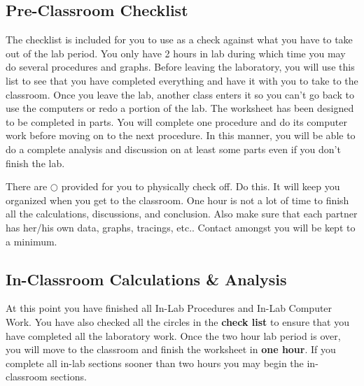 \subsection{Pre-Classroom Checklist}
The checklist is included for you to use as a check against what you have
to take out of the lab period.  You only have 2 hours in lab during which
time you may do several procedures and graphs.  Before leaving the laboratory, 
you will use this list to see that you have completed everything and have it
with you to take to the classroom.  Once you leave the lab, another class
enters it so you can't go back to use the computers or redo a portion of the 
lab.  The worksheet has been designed to be completed in parts.  You
will complete one procedure and do its computer work before moving on to 
the next procedure.  In this manner, you will be able to do a complete
analysis and discussion on at least some parts even if you don't finish
the lab.  

There are $\bigcirc$ provided for you to physically check off.  Do this.
It will keep you organized when you get to the classroom.  One hour
is not a lot of time to finish all the calculations, discussions, and 
conclusion.  Also make sure that each partner has her/his own data,
graphs, tracings, etc..  Contact amongst you will be kept to a minimum.


\subsection{In-Classroom Calculations \& Analysis}
At this point you have finished all In-Lab Procedures and In-Lab 
Computer Work.  You have also checked all the circles in the
{\bf check list} to ensure that you have completed all the laboratory
work.  Once the two hour lab period is over, you will move to the
classroom and finish the worksheet in {\bf one hour}.  If you
complete all in-lab sections sooner than two hours you may begin
the in-classroom sections.  

